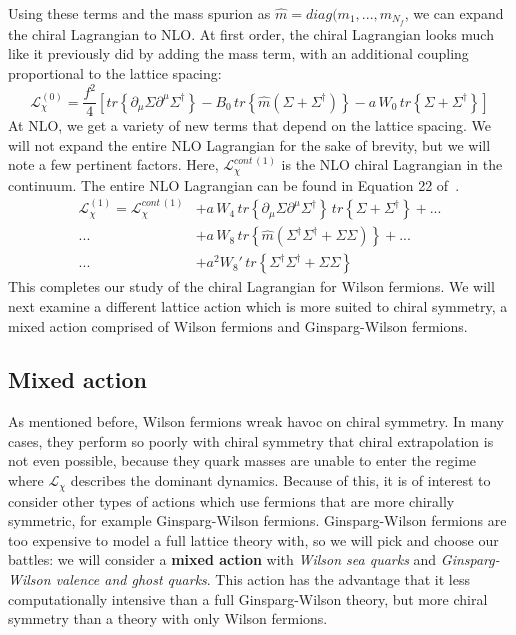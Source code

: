 \documentclass[11pt, oneside]{article}   	%
\theoremstyle{definition}
\begin{document}
Using these terms and the mass spurion as $\hat m = diag(m_1, ..., m_{N_f}$, we can expand the chiral Lagrangian to NLO. 
At first order, the chiral Lagrangian looks much like it previously did by adding the mass term, with an additional coupling 
proportional to the lattice spacing:
\begin{equation}
    \mathcal L^{(0)}_\chi = \frac{f^2}{4}\left[tr\left\{\partial_\mu\Sigma\partial^\mu\Sigma^\dagger\right\} - B_0\,tr\left\{\hat m 
    (\Sigma + \Sigma^\dagger)\right\} - a\,W_0\,tr\left\{\Sigma + \Sigma^\dagger\right\}\right]
\end{equation}
At NLO, we get a variety of new terms that depend on the lattice spacing. We will not expand the entire NLO Lagrangian for 
the sake of brevity, but we will note a few pertinent factors. Here, $\mathcal L_\chi^{cont\,(1)}$ is the NLO chiral Lagrangian 
in the continuum. The entire NLO Lagrangian can be found in Equation 22 of~\cite{bar}. 
    \begin{align}
        \mathcal L_\chi^{(1)} = \mathcal L_\chi^{cont\,(1)} &+ a\, W_4\,tr\left\{\partial_\mu\Sigma\partial^\mu\Sigma^\dagger\right\} \,tr\left\{\Sigma + \Sigma^\dagger\right\} + ... \\
        ...&+ a\, W_8\, tr\left\{\hat m(\Sigma^\dagger \Sigma^\dagger + \Sigma\Sigma)\right\} +... \\
        ...&+ a^2 W_8'\, tr\left\{\Sigma^\dagger\Sigma^\dagger + \Sigma\Sigma\right\}
    \end{align}
This completes our study of the chiral Lagrangian for Wilson fermions. We will next examine a different lattice action which 
is more suited to chiral symmetry, a mixed action comprised of Wilson fermions and Ginsparg-Wilson fermions.

\subsection{Mixed action}

As mentioned before, Wilson fermions wreak havoc on chiral symmetry. In many cases, they perform so poorly with 
chiral symmetry that chiral extrapolation is not even possible, because they quark masses are unable to enter the 
regime where $\mathcal L_\chi$ describes the dominant dynamics. Because of this, it is of interest to consider other 
types of actions which use fermions that are more chirally symmetric, for example Ginsparg-Wilson fermions. 
Ginsparg-Wilson fermions are too expensive to model a full lattice theory with, so we will pick and choose our battles: 
we will consider a \textbf{mixed action} with \textit{Wilson sea quarks} and \textit{Ginsparg-Wilson valence and ghost 
quarks}. This action has the advantage that it less computationally intensive than a full Ginsparg-Wilson theory, but more 
chiral symmetry than a theory with only Wilson fermions. 
\end{document}
